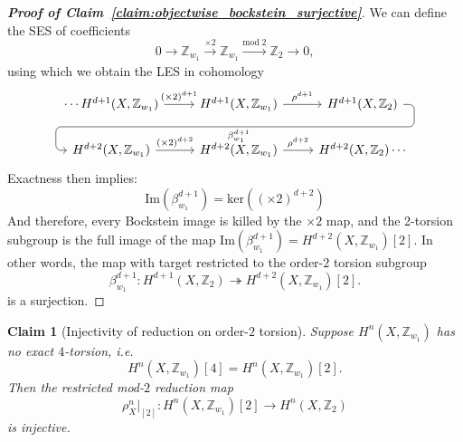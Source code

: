 \documentclass[aps,prx,reprint,superscriptaddress,twocolumn,amsmath,amssymb,amsfonts, nofootinbib]{revtex4-2}
\newcommand{\Z}{\mathbb{Z}}
\theoremstyle{apsstyle}
\newtheorem{claim}{Claim}
\begin{document}
\begin{proof}[\textnormal{\textbf{Proof of Claim~\ref{claim:objectwise_bockstein_surjective}}}]
We can define the SES of coefficients 
\begin{equation*}
    0\to \Z_{w_{1}} \xrightarrow[]{\times 2} \Z_{w_{1}} \xrightarrow[]{\mathrm{mod}\; 2} \Z_{2} \to 0,
\end{equation*}
using which we obtain the LES in cohomology
\begin{equation}
    \begin{tikzcd}
    \cdots H^{d+1}(X,\Z_{w_{1}}) \rar[]{(\times 2)^{d+1}} & H^{d+1}(X,\Z_{w_{1}}) \rar[]{\rho^{d+1}}
             \ar[draw=none]{d}[name=X, anchor=center]{}
    & H^{d+1}(X,\Z_{2}) \ar[rounded corners,
            to path={ -- ([xshift=2ex]\tikztostart.east)
                      |- (X.center) \tikztonodes
                      -| ([xshift=-2ex]\tikztotarget.west)
                      -- (\tikztotarget)}]{dll}[at end]{\beta^{d+1}_{w_{1}}} \\      
  H^{d+2}(X,\Z_{w_{1}}) \rar[]{(\times 2)^{d+2}} & H^{d+2}(X,\Z_{w_{1}}) \rar[]{\rho^{d+2}} & H^{d+2}(X,\Z_{2})\cdots 
\end{tikzcd}
\label{eq:LES}
\end{equation}
Exactness then implies: 
\begin{equation*}
    \mathrm{Im}\left(\beta^{d+1}_{w_{1}}\right) = \mathrm{ker}\left((\times 2)^{d+2}    \right)
\end{equation*}
And therefore, every Bockstein image is killed by the $\times 2$ map, and the 2-torsion subgroup is the full image of the map $\mathrm{Im}(\beta^{d+1}_{w_{1}}) = H^{d+2}(X, \mathbb{Z}_{w_{1}})[2]$. In other words, the map with target restricted to the order-$2$ torsion subgroup
\begin{equation*}
    \beta_{w_{1}}^{d+1}: H^{d+1}(X, \mathbb{Z}_{2}) \twoheadrightarrow H^{d+2}(X, \mathbb{Z}_{w_{1}})[2].    
\end{equation*}
is a surjection.
\end{proof}

\bigskip 

\begin{claim}[Injectivity of reduction on order-$2$ torsion]
\label{claim:rho_injective_order2}
Suppose $H^n(X,\Z_{w_1})$ has no exact $4$-torsion, i.e.
\begin{equation}
H^n(X,\Z_{w_1})[4]=H^n(X,\Z_{w_1})[2].
\end{equation}
Then the restricted mod-$2$ reduction map
\begin{equation}
\rho_{X}^{n}\vert_{[2]}:
H^n(X,\Z_{w_1})[2]\longrightarrow H^n(X,\Z_2)
\end{equation}
is injective.
\end{claim}
\end{document}

